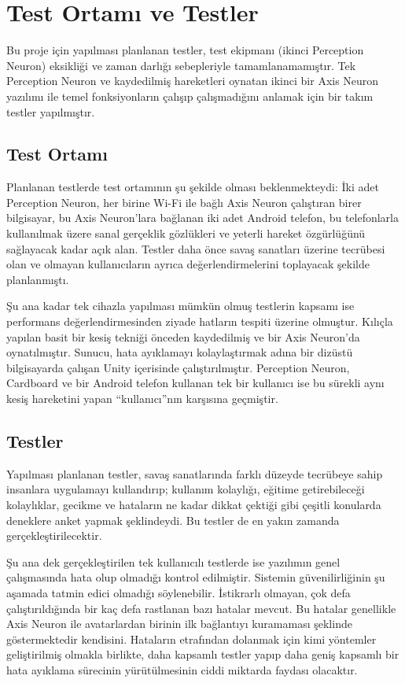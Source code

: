 \documentclass[a4paper, 12pt, titlepage]{article}
\begin{document}
\newpage
\section{Test Ortamı ve Testler}
Bu proje için yapılması planlanan testler, test ekipmanı (ikinci Perception Neuron) eksikliği ve
zaman darlığı sebepleriyle tamamlanamamıştır. Tek Perception Neuron ve kaydedilmiş hareketleri
oynatan ikinci bir Axis Neuron yazılımı ile temel fonksiyonların çalışıp çalışmadığını anlamak için
bir takım testler yapılmıştır.

\subsection{Test Ortamı}
Planlanan testlerde test ortamının şu şekilde olması beklenmekteydi: İki adet Perception Neuron,
her birine Wi-Fi ile bağlı Axis Neuron çalıştıran birer bilgisayar, bu Axis Neuron’lara bağlanan
iki adet Android telefon, bu telefonlarla kullanılmak üzere sanal gerçeklik gözlükleri ve yeterli
hareket özgürlüğünü sağlayacak kadar açık alan. Testler daha önce savaş sanatları üzerine tecrübesi
olan ve olmayan kullanıcıların ayrıca değerlendirmelerini toplayacak şekilde planlanmıştı.

Şu ana kadar tek cihazla yapılması mümkün olmuş testlerin kapsamı ise performans
değerlendirmesinden ziyade hatların tespiti üzerine olmuştur. Kılıçla yapılan basit bir kesiş
tekniği önceden kaydedilmiş ve bir Axis Neuron’da oynatılmıştır. Sunucu, hata ayıklamayı
kolaylaştırmak adına bir dizüstü bilgisayarda çalışan Unity içerisinde çalıştırılmıştır. Perception
Neuron, Cardboard ve bir Android telefon kullanan tek bir kullanıcı ise bu sürekli aynı kesiş
hareketini yapan “kullanıcı”nın karşısına geçmiştir.

\subsection{Testler}
Yapılması planlanan testler, savaş sanatlarında farklı düzeyde tecrübeye sahip insanlara uygulamayı
kullandırıp; kullanım kolaylığı, eğitime getirebileceği kolaylıklar, gecikme ve hataların ne kadar
dikkat çektiği gibi çeşitli konularda deneklere anket yapmak şeklindeydi. Bu testler de en yakın
zamanda gerçekleştirilecektir.

Şu ana dek gerçekleştirilen tek kullanıcılı testlerde ise yazılımın genel çalışmasında hata olup
olmadığı kontrol edilmiştir. Sistemin güvenilirliğinin şu aşamada tatmin edici olmadığı
söylenebilir. İstikrarlı olmayan, çok defa çalıştırıldığında bir kaç defa rastlanan bazı hatalar
mevcut. Bu hatalar genellikle Axis Neuron ile avatarlardan birinin ilk bağlantıyı kuramaması
şeklinde göstermektedir kendisini. Hataların etrafından dolanmak için kimi yöntemler geliştirilmiş
olmakla birlikte, daha kapsamlı testler yapıp daha geniş kapsamlı bir hata ayıklama sürecinin
yürütülmesinin ciddi miktarda faydası olacaktır.
\end{document}

